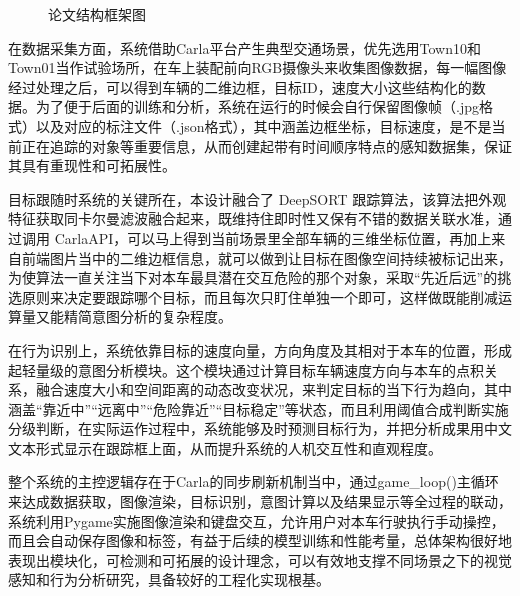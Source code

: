 \begin{figure}[H]
	\centering
	\caption{论文结构框架图}
	\label{fig:example_image}
\end{figure}


在数据采集方面，系统借助Carla平台产生典型交通场景，优先选用Town10和Town01当作试验场所，在车上装配前向RGB摄像头来收集图像数据，每一幅图像经过处理之后，可以得到车辆的二维边框，目标ID，速度大小这些结构化的数据。为了便于后面的训练和分析，系统在运行的时候会自行保留图像帧（.jpg格式）以及对应的标注文件（.json格式），其中涵盖边框坐标，目标速度，是不是当前正在追踪的对象等重要信息，从而创建起带有时间顺序特点的感知数据集，保证其具有重现性和可拓展性。

目标跟随时系统的关键所在，本设计融合了 DeepSORT 跟踪算法，该算法把外观特征获取同卡尔曼滤波融合起来，既维持住即时性又保有不错的数据关联水准，通过调用 CarlaAPI，可以马上得到当前场景里全部车辆的三维坐标位置，再加上来自前端图片当中的二维边框信息，就可以做到让目标在图像空间持续被标记出来，为使算法一直关注当下对本车最具潜在交互危险的那个对象，采取“先近后远”的挑选原则来决定要跟踪哪个目标，而且每次只盯住单独一个即可，这样做既能削减运算量又能精简意图分析的复杂程度。

在行为识别上，系统依靠目标的速度向量，方向角度及其相对于本车的位置，形成起轻量级的意图分析模块。这个模块通过计算目标车辆速度方向与本车的点积关系，融合速度大小和空间距离的动态改变状况，来判定目标的当下行为趋向，其中涵盖“靠近中”“远离中”“危险靠近”“目标稳定”等状态，而且利用阈值合成判断实施分级判断，在实际运作过程中，系统能够及时预测目标行为，并把分析成果用中文文本形式显示在跟踪框上面，从而提升系统的人机交互性和直观程度。

整个系统的主控逻辑存在于Carla的同步刷新机制当中，通过game\_loop()主循环来达成数据获取，图像渲染，目标识别，意图计算以及结果显示等全过程的联动，系统利用Pygame实施图像渲染和键盘交互，允许用户对本车行驶执行手动操控，而且会自动保存图像和标签，有益于后续的模型训练和性能考量，总体架构很好地表现出模块化，可检测和可拓展的设计理念，可以有效地支撑不同场景之下的视觉感知和行为分析研究，具备较好的工程化实现根基。




\begin{tabular}{l l}
\end{tabular}
